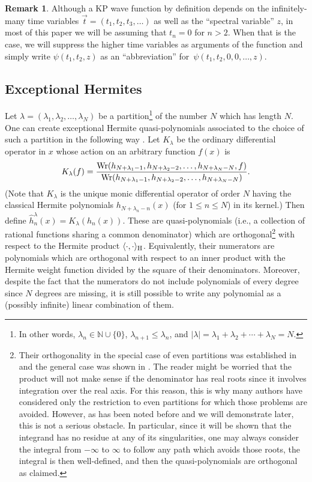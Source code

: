 \documentclass[10pt,a4paper]{amsart}
\numberwithin{equation}{section}
\theoremstyle{definition}
\newtheorem{Remark}[Theorem]{Remark}
\begin{document}
\begin{Remark}
 Although a KP wave function by definition depends on the
 infinitely-many time variables $\vec t=(t_1,t_2,t_3,\ldots)$ as well
 as the ``spectral variable'' $z$, in most of this paper we will be
 assuming that $t_n=0$ for $n>2$. When that is the case, we will
 suppress the higher time variables as arguments of the function and
 simply write
 $\psi(t_1,t_2,z)$ as an ``abbreviation'' for~${\psi(t_1,t_2, 0,0,\ldots,z)}$.
\end{Remark}

\subsection{Exceptional Hermites}\label{sec:exceptionals}

Let $\lambda=(\lambda_1,\lambda_2,\ldots,\lambda_N)$
be a partition\footnote{In other words, $\lambda_n\in\mathbb{N}\cup\{0\}$, $\lambda_{n+1}\leq
\lambda_n$, and $|\lambda|=\lambda_1+\lambda_2+\cdots+\lambda_N=N$.} of the number $N$ which has length $N$.
One can create exceptional Hermite quasi-polynomials
associated to the choice of such a partition
in
the following way \cite{XHermite1,XHermite2}. Let $K_{\lambda}$ be the ordinary differential
operator in $x$ whose action on an arbitrary function $f(x)$ is
\[
K_{\lambda}(f)=\frac{\hbox{Wr}(h_{N+\lambda_1-1},h_{N+\lambda_2-2},\ldots,h_{N+\lambda_N-N},f)}{\hbox{Wr}(h_{N+\lambda_1-1},h_{N+\lambda_2-2},\ldots,h_{N+\lambda_N-N})}.
\]
(Note that $K_{\lambda}$ is the unique monic differential operator of
order $N$ having the classical Hermite polynomials
$h_{N+\lambda_n-n}(x)$ (for $1\leq n\leq N$) in its kernel.)
Then define
$
\hat h_n^{\lambda}(x)=K_{\lambda}(h_n(x))$.
These are quasi-polynomials (i.e., a collection of rational functions
sharing a common denominator) which are orthogonal\footnote{Their
 orthogonality in the special case of even partitions was established
 in \cite{2014dry} and the general case was shown in \cite{HHV}.
The reader
 might be worried that the product will not make sense if the
 denominator has real roots since it involves integration over the
 real axis. For this reason, this is why many authors have
 considered only the restriction to even partitions for which those
 problems are avoided. However, as has
 been noted before \cite{HHV} and
 we will demonstrate later, this is not a serious obstacle. In
 particular, since it will be shown that the integrand has no residue
 at any of its singularities, one may always consider the integral from $-\infty$ to $\infty$
 to follow any path which avoids those roots, the integral is
 then well-defined, and then the quasi-polynomials are
 orthogonal as claimed.} with respect to the Hermite product
$\langle \cdot,\cdot\rangle_{\rm H}$. Equivalently, their numerators are
polynomials which are orthogonal with respect to an inner product
with the Hermite weight function divided by the square of their
denominators. Moreover, despite the fact that the
numerators do not include polynomials of every degree since $N$
degrees are missing, it is still
possible to write any polynomial as a (possibly infinite) linear
combination of them.
\end{document}
